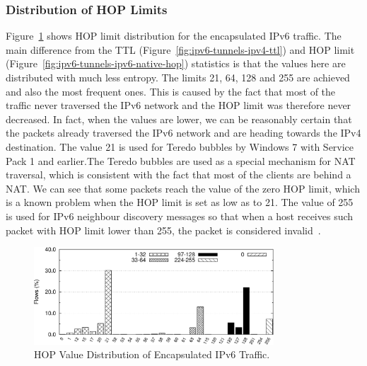 \subsubsection{Distribution of HOP Limits}
Figure~\ref{fig:ipv6-tunnels-tunnels-hop} shows HOP limit distribution for the encapsulated IPv6 traffic. The main difference from the TTL (Figure~\ref{fig:ipv6-tunnels-ipv4-ttl}) and HOP limit (Figure~\ref{fig:ipv6-tunnels-ipv6-native-hop}) statistics is that the values here are distributed with much less entropy. The limits 21, 64, 128 and 255 are achieved and also the most frequent ones. This is caused by the fact that most of the traffic never traversed the IPv6 network and the HOP limit was therefore never decreased. In fact, when the values are lower, we can be reasonably certain that the packets already traversed the IPv6 network and are heading towards the IPv4 destination. The value 21 is used for Teredo bubbles by Windows 7 with Service Pack 1 and earlier.The Teredo bubbles are used as a special mechanism for NAT traversal, which is consistent with the fact that most of the clients are behind a NAT. We can see that some packets reach the value of the zero HOP limit, which is a known problem when the HOP limit is set as low as to 21. The value of 255 is used for IPv6 neighbour discovery messages so that when a host receives such packet with HOP limit lower than 255, the packet is considered invalid~\cite{rfc4861}.

\begin{figure}[!tb]
        \centering
        \includegraphics[width=0.8\textwidth]{figures/paper-tunnels/ttl/hop}
        \caption{HOP Value Distribution of Encapsulated IPv6 Traffic.}
        \label{fig:ipv6-tunnels-tunnels-hop}
\end{figure}


